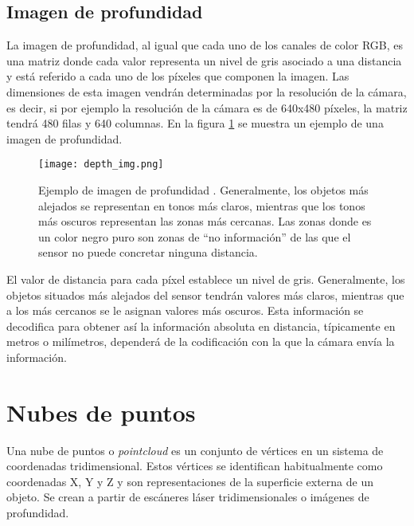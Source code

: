 \subsection{Imagen de profundidad}

La imagen de profundidad, al igual que cada uno de los canales de color RGB, es una matriz donde cada valor representa un nivel de gris asociado a una distancia y está referido a cada uno de los píxeles que componen la imagen. Las dimensiones de esta imagen vendrán determinadas por la resolución de la cámara, es decir, si por ejemplo la resolución de la cámara es de 640x480 píxeles, la matriz tendrá 480 filas y 640 columnas. En la figura \ref{fig:depth} se muestra un ejemplo de una imagen de profundidad. \\

\begin{figure}[H]
	\begin{center} 
		\texttt{[image: depth\_img.png]}
	\end{center}
	\caption{Ejemplo de imagen de profundidad \cite{depthimage}. Generalmente, los objetos más alejados se representan en tonos más claros, mientras que los tonos más oscuros representan las zonas más cercanas. Las zonas donde es un color negro puro son zonas de ``no información'' de las que el sensor no puede concretar ninguna distancia.}
	\label{fig:depth}
\end{figure}


El valor de distancia para cada píxel establece un nivel de gris. Generalmente, los objetos situados más alejados del sensor tendrán valores más claros, mientras que a los más cercanos se le asignan valores más oscuros. Esta información se decodifica para obtener así la información absoluta en distancia, típicamente en metros o milímetros, dependerá de la codificación con la que la cámara envía la información.\\

\section{Nubes de puntos}

Una nube de puntos o \textit{pointcloud} es un conjunto de vértices en un sistema de coordenadas tridimensional. Estos vértices se identifican habitualmente como coordenadas X, Y y Z y son representaciones de la superficie externa de un objeto. Se crean a partir de escáneres láser tridimensionales o imágenes de profundidad.\\

